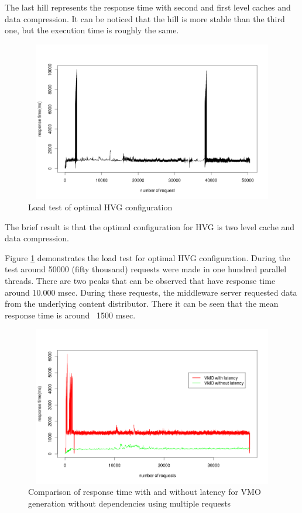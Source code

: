 The last hill represents the response time with second and first level caches and data compression. It can be noticed that the hill is more stable than the third one, but the execution time is roughly the same.


\begin{figure}[h!]
    \centering
    \includegraphics[width=15cm,height=7cm,keepaspectratio]{images/hql_loadtest.png}
    \caption{Load test of optimal HVG configuration}
    \label{fig:hvg_loadtest}
\end{figure}

The brief result is that the optimal configuration for HVG is two level cache and data compression.


Figure \ref{fig:hvg_loadtest} demonstrates the load test for optimal HVG configuration. During the test around 50000 (fifty thousand) requests were made in one hundred parallel threads. There are two peaks that can be observed that have response time around 10.000 msec. During these requests, the middleware server requested data from the underlying content distributor. There it can be seen that the mean response time is around ~1500 msec.


\begin{figure}[h!]
    \centering
    \includegraphics[width=15cm,height=7cm,keepaspectratio]{images/vmo_parallel_comparison.png}
    \caption{Comparison of response time with and without latency for VMO generation without dependencies using multiple requests}
    \label{fig:vmo_comparison}
\end{figure}

